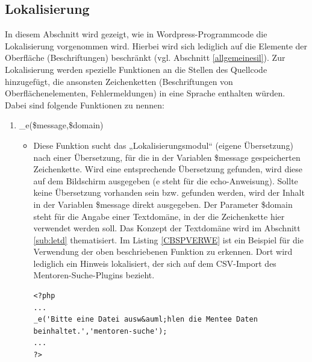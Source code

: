 \subsection{Lokalisierung}\label{sub:lokalisierung}
In diesem Abschnitt wird gezeigt, wie in Wordpress-Programmcode die Lokalisierung vorgenommen wird. Hierbei wird sich lediglich auf die Elemente der Oberfläche (Beschriftungen) beschränkt (vgl. Abschnitt \ref{allgemeinesil}).\newline
Zur Lokalisierung werden spezielle Funktionen an die Stellen des Quellcode hinzugefügt, die ansonsten Zeichenketten (Beschriftungen von Oberflächenelementen, Fehlermeldungen) in eine Sprache enthalten würden. \newline Dabei sind folgende Funktionen zu nennen:
\begin{enumerate}
	\item \_e(\$message,\$domain)
	\begin{itemize}
		\item Diese Funktion sucht das „Lokalisierungsmodul“ (eigene Übersetzung) nach einer Übersetzung, für die in der Variablen \$message gespeicherten Zeichenkette. Wird eine entsprechende Übersetzung gefunden, wird diese auf dem Bildschirm ausgegeben (e steht für die echo-Anweisung). Sollte keine Übersetzung vorhanden sein bzw. gefunden werden, wird der Inhalt in der Variablen \$message direkt ausgegeben. Der Parameter \$domain steht für die Angabe einer Textdomäne, in der die Zeichenkette hier verwendet werden soll. Das Konzept der Textdomäne wird im Abschnitt \ref{sub:letd} thematisiert.\newline 
		Im Listing \ref{CBSPVERWE} ist ein Beispiel für die Verwendung der oben beschriebenen Funktion zu erkennen. Dort wird lediglich ein Hinweis lokalisiert, der sich auf dem CSV-Import des Mentoren-Suche-Plugins bezieht.
\begin{lstlisting}
<?php 
...
_e('Bitte eine Datei ausw&auml;hlen die Mentee Daten beinhaltet.','mentoren-suche');
...
?> 
\end{lstlisting}		
				

\end{itemize}
\end{enumerate}
